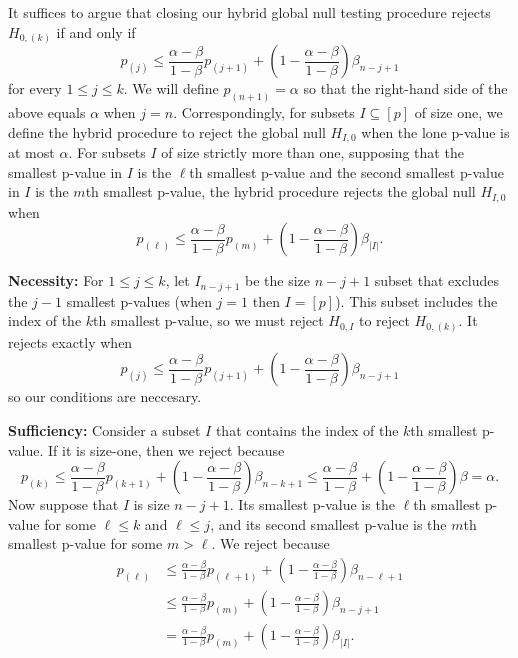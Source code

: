 \documentclass{article}
\begin{document}
\begin{appendix}
It suffices to argue that closing our hybrid global null testing procedure rejects $H_{0, (k)}$ if and only if 
\begin{equation*}
p_{(j)} \leq \frac{\alpha - \beta}{1-\beta} p_{(j + 1)} + \left(1 - \frac{\alpha - \beta}{1-\beta} \right)\beta_{n - j + 1} 
\end{equation*}
for every $1 \leq j \leq k$. We will define $p_{(n+1)} = \alpha$ so that the right-hand side of the above equals $\alpha$ when $j = n$. Correspondingly, for subsets $I \subseteq [p]$ of size one, we define the hybrid procedure to reject the global null $H_{I, 0}$ when the lone p-value is at most $\alpha$. For subsets $I$ of size strictly more than one, supposing that the smallest p-value in $I$ is the $\ell$th smallest p-value and the second smallest p-value in $I$ is the $m$th smallest p-value, the hybrid procedure rejects the global null $H_{I, 0}$ when
\begin{equation*}
    p_{(\ell)} \leq \frac{\alpha-\beta}{1-\beta} p_{(m)} + \left(1 - \frac{\alpha - \beta}{1-\beta} \right)\beta_{|I|}.
\end{equation*}

\noindent \textbf{Necessity: } For $1 \leq j \leq k$, let $I_{n-j + 1}$ be the size $n - j + 1$ subset that excludes the $j - 1$ smallest p-values (when $j = 1$ then $I = [p]$). This subset includes the index of the $k$th smallest p-value, so we must reject $H_{0, I}$ to reject $H_{0, (k)}$. It rejects exactly when
\begin{equation*}
    p_{(j)} \leq \frac{\alpha - \beta}{1-\beta} p_{(j + 1)} + \left(1 - \frac{\alpha - \beta}{1-\beta} \right)\beta_{n - j + 1}
\end{equation*}
so our conditions are neccesary. \newline 

\noindent \textbf{Sufficiency: } Consider a subset $I$ that contains the index of the $k$th smallest p-value. If it is size-one, then we reject because 
\begin{equation*}
    p_{(k)} \leq \frac{\alpha - \beta}{1-\beta}p_{(k + 1)} + \left(1 - \frac{\alpha - \beta}{1-\beta} \right) \beta_{n - k + 1} \leq \frac{\alpha - \beta}{1-\beta} + \left(1 - \frac{\alpha - \beta}{1-\beta} \right)\beta = \alpha. 
\end{equation*}
Now suppose that $I$ is size $n-j+1$.  Its smallest p-value is the $\ell$th smallest p-value for some $\ell \leq k$ and $\ell \leq j$, and its second smallest p-value is the $m$th smallest p-value for some $m > \ell$. We reject because 
\begin{align*}
    p_{(\ell)} &\leq \frac{\alpha-\beta}{1-\beta} p_{(\ell + 1)} + \left(1 - \frac{\alpha - \beta}{1-\beta} \right)\beta_{ n - \ell + 1}\\
    &\leq \frac{\alpha-\beta}{1-\beta} p_{(m)} + \left(1 - \frac{\alpha - \beta}{1-\beta} \right)\beta_{ n - j + 1} \\
    &= \frac{\alpha-\beta}{1-\beta} p_{(m)} + \left(1 - \frac{\alpha - \beta}{1-\beta} \right)\beta_{|I|}.
\end{align*}


\end{appendix}
\end{document}
